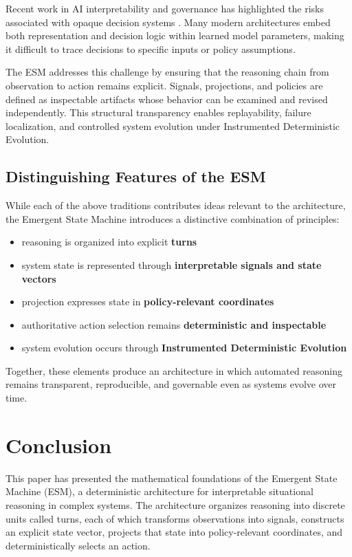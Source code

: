 \documentclass[11pt]{article}
\begin{document}
Recent work in AI interpretability and governance has highlighted the risks associated with opaque decision systems \citep{doshi2017,mittelstadt2016}. Many modern architectures embed both representation and decision logic within learned model parameters, making it difficult to trace decisions to specific inputs or policy assumptions.

The ESM addresses this challenge by ensuring that the reasoning chain from observation to action remains explicit. Signals, projections, and policies are defined as inspectable artifacts whose behavior can be examined and revised independently. This structural transparency enables replayability, failure localization, and controlled system evolution under Instrumented Deterministic Evolution.

\subsection{Distinguishing Features of the ESM}

While each of the above traditions contributes ideas relevant to the architecture, the Emergent State Machine introduces a distinctive combination of principles:

\begin{itemize}
\item reasoning is organized into explicit \textbf{turns}
\item system state is represented through \textbf{interpretable signals and state vectors}
\item projection expresses state in \textbf{policy-relevant coordinates}
\item authoritative action selection remains \textbf{deterministic and inspectable}
\item system evolution occurs through \textbf{Instrumented Deterministic Evolution}
\end{itemize}

Together, these elements produce an architecture in which automated reasoning remains transparent, reproducible, and governable even as systems evolve over time.



\section{Conclusion}

This paper has presented the mathematical foundations of the Emergent State Machine (ESM), a deterministic architecture for interpretable situational reasoning in complex systems. The architecture organizes reasoning into discrete units called turns, each of which transforms observations into signals, constructs an explicit state vector, projects that state into policy-relevant coordinates, and deterministically selects an action.
\end{document}
